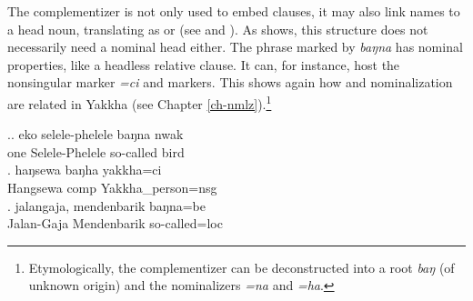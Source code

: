 The complementizer is not only used to embed clauses, it may also link names to a head noun, translating as  or  (see \Next[a] and \Next[b]). As  \Next[c] shows, this structure does not necessarily need a nominal head either. The phrase marked by \emph{baŋna} has nominal properties, like a headless relative clause. It can, for instance, host the nonsingular marker \emph{=ci} and  markers. This shows again how  and nominalization are related in Yakkha (see Chapter \ref{ch-nmlz}).\footnote{Etymologically, the complementizer can be deconstructed into a root \emph{baŋ} (of unknown origin) and the nominalizers \emph{=na} and \emph{=ha}.}

\ex.\ag. eko selele-phelele baŋna nwak\\
one Selele-Phelele so-called bird\\
 
\bg. haŋsewa       baŋha         yakkha=ci\\
Hangsewa {\sc comp} Yakkha\_person{\sc =nsg}\\
 
\bg.   jalangaja, mendenbarik baŋna=be   \\
Jalan-Gaja Mendenbarik so-called{\sc =loc}\\
  


 	